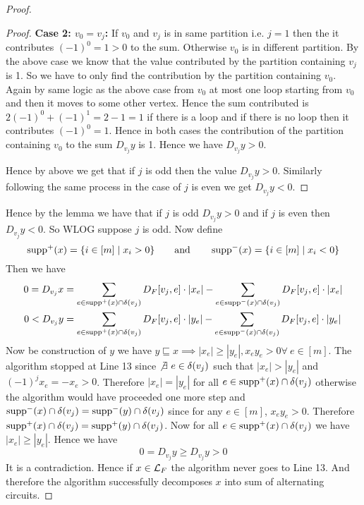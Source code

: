 \begin{proof}
\begin{proof}
\textbf{Case 2: $v_0=v_j$:} If $v_0$ and $v_j$ is in same partition i.e. $j=1$ then the it contributes $(-1)^0=1>0$ to the sum. Otherwise $v_0$ is in different partition. By the above case we know that the value contributed by the partition containing $v_j$ is 1. So we have to only find the contribution by the partition containing $v_0$. Again by same logic as the above case from $v_0$ at most one loop starting from $v_0$ and then it moves to some other vertex. Hence the sum contributed is $2(-1)^0+(-1)^1=2-1=1$ if there is a loop and if there is no loop then it contributes $(-1)^0=1$. Hence in both cases the contribution of the partition containing $v_0$ to the sum $D_{v_j}y$ is 1. Hence we have $D_{v_j}y>0$.\parinn

Hence by above we get that if $j$ is odd then the value $D_{v_j}y>0$. Similarly following the same process in the case of $j$ is even we get $D_{v_j}y<0$.\end{proof}

\vspace*{5mm}

Hence by the lemma we have that if $j$ is odd $D_{v_j}y>0$ and if $j$ is even then $D_{v_j}y<0$. So WLOG suppose $j$ is odd. Now define $$\operatorname{supp}^+(x)=\{i\in [m]\mid x_i>0\}\qquad \text{and}\qquad \operatorname{supp}^-(x)=\{i\in[m]\mid x_i<0\}$$Then we have \begin{align*}
	0=D_{v_j}x & = \sum_{e\in \operatorname{supp}^+(x)\cap \delta(v_j)} D_F[v_j,e]\cdot |x_e| -\sum_{e\in \operatorname{supp}^-(x)\cap \delta(v_j)}D_F[v_j,e]\cdot|x_e| \\
	0<D_{v_j}y & = \sum_{e\in \operatorname{supp}^+(x)\cap \delta(v_j)} D_F[v_j,e]\cdot |y_e| -\sum_{e\in \operatorname{supp}^-(x)\cap \delta(v_j)}D_F[v_j,e]\cdot|y_e|
\end{align*}
Now be construction of $y$ we have $y\sqsubseteq x\implies |x_e|\geq |y_e|, x_ey_e>0\forall\ e\in[m]$. The algorithm stopped at Line 13 since $\not\exists\ e\in \delta(v_j)$ such that $|x_e|>|y_e|$ and $(-1)^jx_e=-x_e>0$. Therefore $|x_e|=|y_e| $ for all $e\in \operatorname{supp}^+(x)\cap \delta(v_j)$ otherwise the algorithm would have proceeded one more step and $\operatorname{supp}^-(x)\cap\delta(v_j)=\operatorname{supp}^-(y)\cap \delta(v_j)$ since for any $e\in[m]$, $x_ey_e>0$. Therefore $\operatorname{supp}^+(x)\cap \delta(v_j)=\operatorname{supp}^+(y)\cap \delta(v_j)$. Now for all $e\in \operatorname{supp}^+(x)\cap \delta(v_j)$ we have $|x_e|\geq |y_e|$. Hence we have $$0=D_{v_j}y\geq D_{v_j}y>0$$It is a contradiction. Hence if $x\in \mathcal{L}_F$ the algorithm never goes to Line 13. And therefore the algorithm successfully decomposes $x$ into sum of alternating circuits.
\end{proof}

